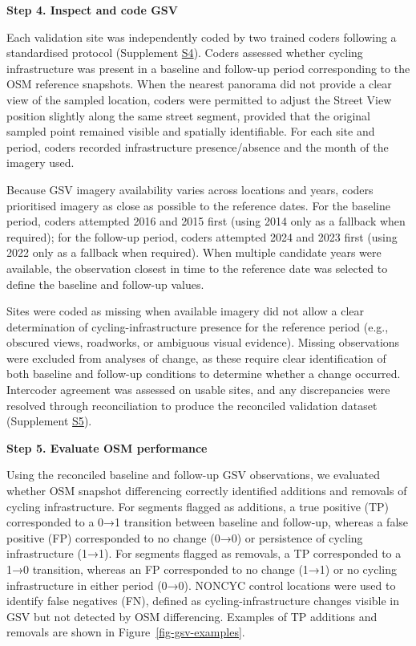 \documentclass[
]{article}
\begin{document}
\textbf{Step 4. Inspect and code GSV}

Each validation site was independently coded by two trained coders
following a standardised protocol (Supplement
\hyperref[s4-gsv-protocol]{S4}). Coders assessed whether cycling
infrastructure was present in a baseline and follow-up period
corresponding to the OSM reference snapshots. When the nearest panorama
did not provide a clear view of the sampled location, coders were
permitted to adjust the Street View position slightly along the same
street segment, provided that the original sampled point remained
visible and spatially identifiable. For each site and period, coders
recorded infrastructure presence/absence and the month of the imagery
used.

Because GSV imagery availability varies across locations and years,
coders prioritised imagery as close as possible to the reference dates.
For the baseline period, coders attempted 2016 and 2015 first (using
2014 only as a fallback when required); for the follow-up period, coders
attempted 2024 and 2023 first (using 2022 only as a fallback when
required). When multiple candidate years were available, the observation
closest in time to the reference date was selected to define the
baseline and follow-up values.

Sites were coded as missing when available imagery did not allow a clear
determination of cycling-infrastructure presence for the reference
period (e.g., obscured views, roadworks, or ambiguous visual evidence).
Missing observations were excluded from analyses of change, as these
require clear identification of both baseline and follow-up conditions
to determine whether a change occurred. Intercoder agreement was
assessed on usable sites, and any discrepancies were resolved through
reconciliation to produce the reconciled validation dataset (Supplement
\hyperref[s5-joined-results]{S5}).

\textbf{Step 5. Evaluate OSM performance}

Using the reconciled baseline and follow-up GSV observations, we
evaluated whether OSM snapshot differencing correctly identified
additions and removals of cycling infrastructure. For segments flagged
as additions, a true positive (TP) corresponded to a 0→1 transition
between baseline and follow-up, whereas a false positive (FP)
corresponded to no change (0→0) or persistence of cycling infrastructure
(1→1). For segments flagged as removals, a TP corresponded to a 1→0
transition, whereas an FP corresponded to no change (1→1) or no cycling
infrastructure in either period (0→0). NONCYC control locations were
used to identify false negatives (FN), defined as cycling-infrastructure
changes visible in GSV but not detected by OSM differencing. Examples of
TP additions and removals are shown in Figure~\ref{fig-gsv-examples}.
\end{document}

